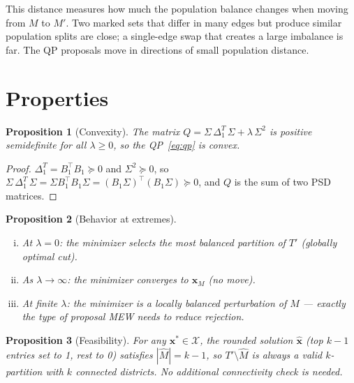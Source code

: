 \documentclass[11pt]{article}
\newtheorem{proposition}{Proposition}[section]
\begin{document}
This distance measures how much the population balance changes when moving from $M$ to $M'$. Two marked sets that differ in many edges but produce similar population splits are close; a single-edge swap that creates a large imbalance is far. The QP proposals move in directions of small population distance.


\section{Properties}\label{sec:properties}

\begin{proposition}[Convexity]\label{prop:convex}
The matrix $Q = \Sigma\,\Delta_1^T\,\Sigma + \lambda\,\Sigma^2$ is positive semidefinite for all $\lambda \geq 0$, so the QP~\eqref{eq:qp} is convex.
\end{proposition}

\begin{proof}
$\Delta_1^T = B_1^\top B_1 \succeq 0$ and $\Sigma^2 \succeq 0$, so $\Sigma\,\Delta_1^T\,\Sigma = \Sigma B_1^\top B_1 \Sigma = (B_1 \Sigma)^\top (B_1 \Sigma) \succeq 0$, and $Q$ is the sum of two PSD matrices.
\end{proof}

\begin{proposition}[Behavior at extremes]\label{prop:extremes}
\begin{enumerate}[(i)]
\item At $\lambda = 0$: the minimizer selects the most balanced partition of $T'$ (globally optimal cut).
\item As $\lambda \to \infty$: the minimizer converges to $\mathbf{x}_M$ (no move).
\item At finite $\lambda$: the minimizer is a locally balanced perturbation of $M$ --- exactly the type of proposal MEW needs to reduce rejection.
\end{enumerate}
\end{proposition}

\begin{proposition}[Feasibility]\label{prop:feasibility}
For any $\mathbf{x}^* \in \mathcal{X}$, the rounded solution $\hat{\mathbf{x}}$ (top $k-1$ entries set to 1, rest to 0) satisfies $|\hat{M}| = k-1$, so $T' \setminus \hat{M}$ is always a valid $k$-partition with $k$ connected districts. No additional connectivity check is needed.
\end{proposition}
\end{document}
